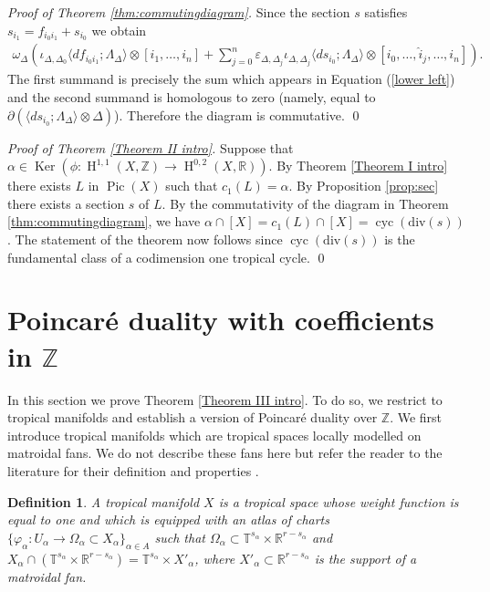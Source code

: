 \documentclass[11pt]{article}
\numberwithin{equation}{numsection}
\newcommand{\Z}{{\mathbb Z}}
\newcommand{\R}{{\mathbb R}}
\newcommand{\T}{{\mathbb T}}
\renewcommand{\div}{\mathrm{div}}
\DeclareMathOperator{\Pic}{Pic}
\DeclareMathOperator{\cyc}{cyc}
\DeclareMathOperator{\Ker}{Ker}
\DeclareMathOperator{\HH}{H}
\newtheorem{defn}[thm]{Definition}
\begin{document}
\begin{proof}[Proof of Theorem \ref{thm:commutingdiagram}]
Since the section $s$ satisfies 
$s_{i_1} = f_{i_0 i_1} + s_{i_0}$ 
we obtain
 \begin{align*} \label{eq homologous}
\omega_\Delta  \left( \iota_{\Delta, \Delta_0} \langle d f_{i_0 i_1}; \Lambda_\Delta \rangle \otimes  [i_1,  \ldots, i_n] +   
\sum_{j=0}^n \varepsilon_{\Delta, \Delta_j} 
\iota_{\Delta, \Delta_j} \langle  d s_{i_0}; \Lambda_\Delta \rangle \otimes  [i_0, \ldots, \hat{i}_j, \ldots, i_n] \right).
\end{align*}
The first summand is precisely the sum which appears in Equation (\ref{lower left})
and the second summand is homologous to zero (namely, equal to $\partial( \langle d s_{i_0}; \Lambda_\Delta \rangle \otimes \Delta)$). 
Therefore the diagram is commutative. 
\qed
\end{proof}

\begin{proof} [Proof of Theorem \ref{Theorem II intro}]



Suppose that $\alpha \in  \Ker(\phi \colon \HH^{1, 1}(X, \Z) \to \HH^{0,2}(X, \R))$.
By Theorem  \ref{Theorem I intro} there exists $L$ in $\Pic(X)$ 
such that $c_1(L) = \alpha$. 
By Proposition \ref{prop:sec} there exists a section $s$ of $L$.
By the commutativity of the diagram in Theorem \ref{thm:commutingdiagram}, we have 
$\alpha \cap [X] = c_1(L) \cap [X] = \cyc(\div(s))$. 
The statement of the theorem now follows since $\cyc(\div(s))$ is the fundamental class of a codimension one tropical cycle. 
 \qed
\end{proof}







\section{Poincar\'e duality with coefficients in $\Z$}
\label{sec:poincare}

In this section we prove Theorem \ref{Theorem III intro}. 
To do so, we restrict to tropical manifolds and establish a version of Poincar\'e duality over $\Z$.  
We first introduce tropical manifolds which are tropical spaces locally modelled on matroidal fans. 
We do not describe these fans here but refer the reader to the literature for their definition and properties \cite{ArdilaKlivans,Shaw:IntMat,FrancoisRau}. 



\begin{defn} 
\label{def:tropicalmanifold}
 A \emph{tropical manifold} $X$ is a tropical space  whose weight function is equal to one and 
which is equipped with an atlas of charts 
$\{\varphi_{\alpha} \colon U_{\alpha} \rightarrow \Omega_{\alpha} \subset X_{\alpha}\}_{{\alpha}  \in A}$ such that  
$\Omega_{\alpha} \subset \T^{s_{\alpha}} \times \R^{r-s_{\alpha}}$ and 
$X_{\alpha} \cap (\T^{s_{\alpha}} \times \R^{r-s_{\alpha}}) = \T^{s_{\alpha}} \times X'_{\alpha}$, where 
$X'_{\alpha} \subset \R^{r-s_{\alpha}}$  is the support of a matroidal fan. 
\end{defn}
\end{document}
